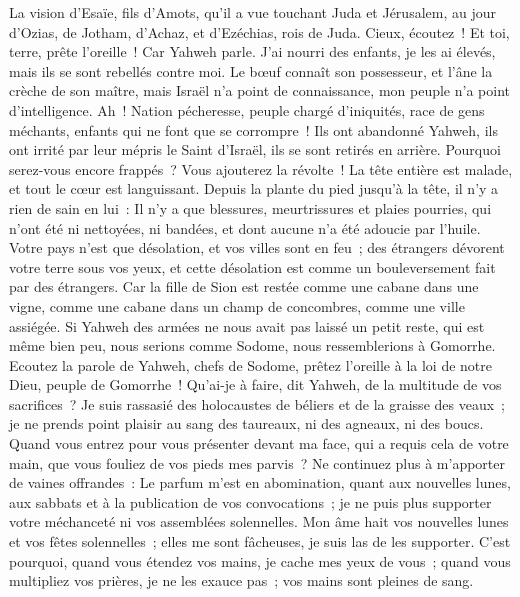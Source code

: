 \begin{multicols}{2}
\VerseOne{}La vision d'Esaïe, fils d'Amots, qu'il a vue touchant Juda et Jérusalem, au jour d'Ozias, de Jotham, d'Achaz, et d'Ezéchias, rois de Juda.
Cieux, écoutez~! Et toi, terre, prête l'oreille~! Car Yahweh parle. J'ai nourri des enfants, je les ai élevés, mais ils se sont rebellés contre moi.
Le bœuf connaît son possesseur, et l'âne la crèche de son maître, mais Israël n'a point de connaissance, mon peuple n'a point d'intelligence.
Ah~! Nation pécheresse, peuple chargé d'iniquités, race de gens méchants, enfants qui ne font que se corrompre~! Ils ont abandonné Yahweh, ils ont irrité par leur mépris le Saint d'Israël, ils se sont retirés en arrière.
Pourquoi serez-vous encore frappés~? Vous ajouterez la révolte~! La tête entière est malade, et tout le cœur est languissant.
Depuis la plante du pied jusqu'à la tête, il n'y a rien de sain en lui~: Il n'y a que blessures, meurtrissures et plaies pourries, qui n'ont été ni nettoyées, ni bandées, et dont aucune n'a été adoucie par l'huile.
Votre pays n'est que désolation, et vos villes sont en feu~; des étrangers dévorent votre terre sous vos yeux, et cette désolation est comme un bouleversement fait par des étrangers.
Car la fille de Sion est restée comme une cabane dans une vigne, comme une cabane dans un champ de concombres, comme une ville assiégée.
Si Yahweh des armées ne nous avait pas laissé un petit reste, qui est même bien peu, nous serions comme Sodome, nous ressemblerions à Gomorrhe.
Ecoutez la parole de Yahweh, chefs de Sodome, prêtez l'oreille à la loi de notre Dieu, peuple de Gomorrhe~!
Qu'ai-je à faire, dit Yahweh, de la multitude de vos sacrifices~? Je suis rassasié des holocaustes de béliers et de la graisse des veaux~; je ne prends point plaisir au sang des taureaux, ni des agneaux, ni des boucs.
Quand vous entrez pour vous présenter devant ma face, qui a requis cela de votre main, que vous fouliez de vos pieds mes parvis~?
Ne continuez plus à m'apporter de vaines offrandes~: Le parfum m'est en abomination, quant aux nouvelles lunes, aux sabbats et à la publication de vos convocations~; je ne puis plus supporter votre méchanceté ni vos assemblées solennelles.
Mon âme hait vos nouvelles lunes et vos fêtes solennelles~; elles me sont fâcheuses, je suis las de les supporter.
C'est pourquoi, quand vous étendez vos mains, je cache mes yeux de vous~; quand vous multipliez vos prières, je ne les exauce pas~; vos mains sont pleines de sang.

\end{multicols}
